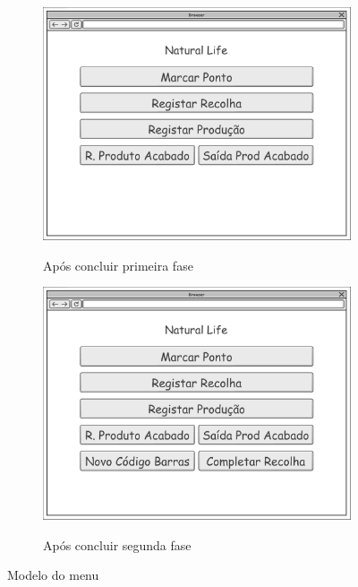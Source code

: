\begin{figure}[H]
	\centering
	
	\begin{subfigure}[t]{0.45\linewidth}
		\includegraphics[width=\linewidth]{figuras/Diagramas_vp/DI_Fabrica_0-Menu_Inicial_-1a_Fase.png}
		\label{fig:di_fabrica_menu_1}
		\caption{Após concluir primeira fase}
	\end{subfigure}
	\begin{subfigure}[t]{0.45\linewidth}
		\includegraphics[width=\linewidth]{figuras/Diagramas_vp/DI_Fabrica_0-Menu_Inicial_-2a_Fase.png}
		\label{fig:di_fabrica_menu_2}
		\caption{Após concluir segunda fase}
	\end{subfigure}
	
	\caption{Modelo do menu}
	\label{fig:di_fabrica_menu}
\end{figure}